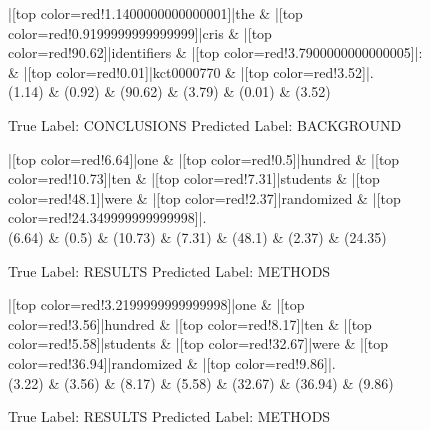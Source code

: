 \documentclass[a4paper, landscape]{article}
\begin{document}
\clearpage
\begin{figure}
\begin{center}
\begin{dependency}
\begin{deptext}
|[top color=red!1.1400000000000001]|the \& |[top color=red!0.9199999999999999]|cris \& |[top color=red!90.62]|identifiers \& |[top color=red!3.7900000000000005]|: \& |[top color=red!0.01]|kct0000770 \& |[top color=red!3.52]|.\\
(1.14) \& (0.92) \& (90.62) \& (3.79) \& (0.01) \& (3.52)\\
\end{deptext}
\end{dependency}
\end{center}
\caption{True Label: CONCLUSIONS Predicted Label: BACKGROUND}
\end{figure}
\clearpage
\begin{figure}
\begin{center}
\begin{dependency}
\begin{deptext}
|[top color=red!6.64]|one \& |[top color=red!0.5]|hundred \& |[top color=red!10.73]|ten \& |[top color=red!7.31]|students \& |[top color=red!48.1]|were \& |[top color=red!2.37]|randomized \& |[top color=red!24.349999999999998]|.\\
(6.64) \& (0.5) \& (10.73) \& (7.31) \& (48.1) \& (2.37) \& (24.35)\\
\end{deptext}
\end{dependency}
\end{center}
\caption{True Label: RESULTS Predicted Label: METHODS}
\end{figure}
\clearpage
\begin{figure}
\begin{center}
\begin{dependency}
\begin{deptext}
|[top color=red!3.2199999999999998]|one \& |[top color=red!3.56]|hundred \& |[top color=red!8.17]|ten \& |[top color=red!5.58]|students \& |[top color=red!32.67]|were \& |[top color=red!36.94]|randomized \& |[top color=red!9.86]|.\\
(3.22) \& (3.56) \& (8.17) \& (5.58) \& (32.67) \& (36.94) \& (9.86)\\
\end{deptext}
\end{dependency}
\end{center}
\caption{True Label: RESULTS Predicted Label: METHODS}
\end{figure}
\end{document}
